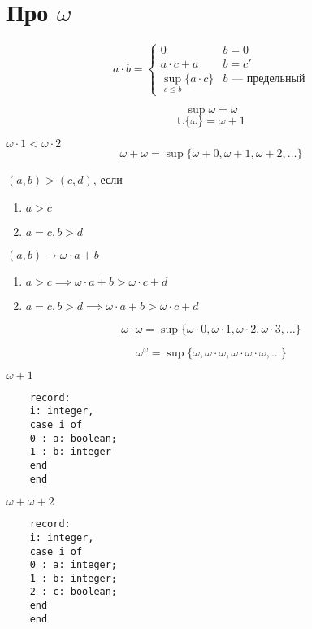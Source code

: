 \documentclass[oneside]{book}
\begin{document}
\section{Про \(\omega\)}
\label{sec:org91eb74b}
\begin{definition}
	\[ a \cdot b = \begin{cases}
			0                           & b = 0                   \\
			a\cdot c + a                & b = c'                  \\
			\sup_{c \le b}\{a \cdot c\} & b\text{ --- предельный}
		\end{cases} \]
	\label{orgd9c72ec}
\end{definition}
\begin{remark}
	\[ \sup \omega = \omega \]
	\[ \cup \{\omega\} = \omega + 1 \]
\end{remark}
\begin{examp}
	\(\omega \cdot 1 < \omega \cdot 2\)
	\[ \omega + \omega = \sup \{\omega + 0, \omega + 1, \omega + 2, \dots\} \]
\end{examp}
\begin{examp}
	\((a, b) > (c, d)\), если
	\begin{enumerate}
		\item \(a > c\)
		\item \(a = c, b > d\)
	\end{enumerate}
	\((a, b) \to \omega \cdot a + b\)
	\begin{enumerate}
		\item \(a > c \implies \omega \cdot a + b > \omega \cdot c + d\)
		\item \(a = c, b > d \implies \omega \cdot a + b > \omega \cdot c + d\) \fixme
	\end{enumerate}
\end{examp}
\begin{examp}
	\[ \omega \cdot \omega = \sup \{\omega \cdot 0, \omega \cdot 1, \omega \cdot 2, \omega \cdot 3, \dots\} \]
\end{examp}
\begin{examp}
	\[ \omega^\omega = \sup \{\omega, \omega \cdot \omega, \omega \cdot \omega \cdot \omega, \dots\} \]
\end{examp}
\begin{examp}
	\(\omega + 1\)
	\begin{verbatim}
    record:
    i: integer,
    case i of
    0 : a: boolean;
    1 : b: integer
    end
    end
  \end{verbatim}
	\fixme
\end{examp}
\begin{examp}
	\(\omega + \omega + 2\)
	\begin{verbatim}
    record:
    i: integer,
    case i of
    0 : a: integer;
    1 : b: integer;
    2 : c: boolean;
    end
    end
  \end{verbatim}
\end{examp}
\end{document}
